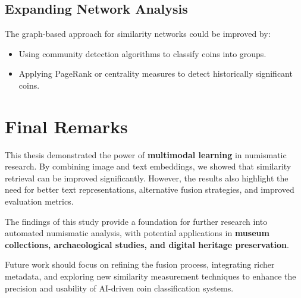 \documentclass[nolibertine, english, algorithm, nomencl, minted]{ttlab-qualify}
\begin{document}
\subsection{Expanding Network Analysis}
The graph-based approach for similarity networks could be improved by:
\begin{itemize}
    \item Using community detection algorithms to classify coins into groups.
    \item Applying PageRank or centrality measures to detect historically significant coins.
\end{itemize}

\section{Final Remarks}
\label{sec:final_remarks}

This thesis demonstrated the power of \textbf{multimodal learning} in numismatic research. 
By combining image and text embeddings, we showed that similarity retrieval can be improved significantly. 
However, the results also highlight the need for better text representations, alternative fusion strategies, 
and improved evaluation metrics.

The findings of this study provide a foundation for further research into automated numismatic analysis, 
with potential applications in \textbf{museum collections, archaeological studies, and digital heritage preservation}.

Future work should focus on refining the fusion process, integrating richer metadata, 
and exploring new similarity measurement techniques to enhance the precision and usability 
of AI-driven coin classification systems.


\printbibliography
\end{document}
